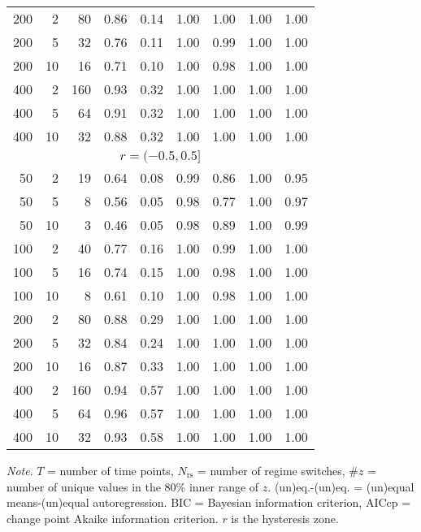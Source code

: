\begin{table}
\begin{center}
\begin{tabular}{rrr cc cc cc}
  200 & 2  & 80  & 0.86 & 0.14 & 1.00 & 1.00 & 1.00 & 1.00 \\ 
  200 & 5  & 32  & 0.76 & 0.11 & 1.00 & 0.99 & 1.00 & 1.00 \\ 
  200 & 10 & 16  & 0.71 & 0.10 & 1.00 & 0.98 & 1.00 & 1.00 \\ 
  400 & 2  & 160 & 0.93 & 0.32 & 1.00 & 1.00 & 1.00 & 1.00 \\ 
  400 & 5  & 64  & 0.91 & 0.32 & 1.00 & 1.00 & 1.00 & 1.00 \\ 
  400 & 10 & 32  & 0.88 & 0.32 & 1.00 & 1.00 & 1.00 & 1.00 \\ 
  \hline
  \multicolumn{9}{c}{$r = (-0.5, 0.5]$ } \\
  50  & 2  & 19  & 0.64 & 0.08 & 0.99 & 0.86 & 1.00 & 0.95 \\ 
  50  & 5  & 8   & 0.56 & 0.05 & 0.98 & 0.77 & 1.00 & 0.97 \\ 
  50  & 10 & 3   & 0.46 & 0.05 & 0.98 & 0.89 & 1.00 & 0.99 \\
  100 & 2  & 40  & 0.77 & 0.16 & 1.00 & 0.99 & 1.00 & 1.00 \\ 
  100 & 5  & 16  & 0.74 & 0.15 & 1.00 & 0.98 & 1.00 & 1.00 \\ 
  100 & 10 & 8   & 0.61 & 0.10 & 1.00 & 0.98 & 1.00 & 1.00 \\ 
  200 & 2  & 80  & 0.88 & 0.29 & 1.00 & 1.00 & 1.00 & 1.00 \\ 
  200 & 5  & 32  & 0.84 & 0.24 & 1.00 & 1.00 & 1.00 & 1.00 \\ 
  200 & 10 & 16  & 0.87 & 0.33 & 1.00 & 1.00 & 1.00 & 1.00 \\ 
  400 & 2  & 160 & 0.94 & 0.57 & 1.00 & 1.00 & 1.00 & 1.00 \\ 
  400 & 5  & 64  & 0.96 & 0.57 & 1.00 & 1.00 & 1.00 & 1.00 \\ 
  400 & 10 & 32  & 0.93 & 0.58 & 1.00 & 1.00 & 1.00 & 1.00 \\ 
   \hline
\end{tabular}
\end{center}
\small\textit{Note}.
$T$ = number of time points,
$N_{\mathrm{rs}}$ = number of regime switches,
\#$z$ = number of unique values in the 80\% inner range of $z$.
(un)eq.-(un)eq. = (un)equal means-(un)equal autoregression.
BIC = Bayesian information criterion, AICcp = change point Akaike information criterion.
$r$ is the hysteresis zone.
\label{tab:model_selection_results}
\end{table}

